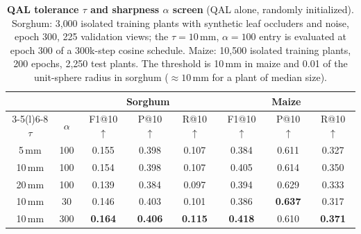 \documentclass[10pt,twocolumn,letterpaper]{article}
\begin{document}
\begin{table}[t]
  \caption{\textbf{QAL tolerance $\tau$ and sharpness $\alpha$ screen} (QAL alone, randomly initialized). Sorghum:
  3{,}000 isolated training plants with synthetic leaf occluders and noise, epoch 300, 225 validation views; the
  $\tau=10$\,mm, $\alpha=100$ entry is evaluated at epoch 300 of a 300k-step cosine schedule. Maize: 10{,}500 isolated
  training plants, 200 epochs, 2{,}250 test plants. The threshold is 10\,mm in maize and 0.01 of the unit-sphere radius
  in sorghum ($\approx 10$\,mm for a plant of median size).}
  \label{tab:qal_params}
  \centering\footnotesize
  \setlength{\tabcolsep}{2.5pt}
  \begin{tabular}{@{}cccccccc@{}}
    \toprule
    & & \multicolumn{3}{c}{Sorghum} & \multicolumn{3}{c}{Maize} \\
    \cmidrule(lr){3-5}\cmidrule(l){6-8}
    $\tau$ & $\alpha$ & F1@10 $\uparrow$ & P@10 $\uparrow$ & R@10 $\uparrow$ & F1@10 $\uparrow$ & P@10 $\uparrow$ & R@10 $\uparrow$ \\
    \midrule
    5\,mm  & 100 & 0.155 & 0.398 & 0.107 & 0.384 & 0.611 & 0.327 \\
    10\,mm & 100 & 0.154 & 0.398 & 0.107 & 0.405 & 0.614 & 0.350 \\
    20\,mm & 100 & 0.139 & 0.384 & 0.097 & 0.394 & 0.629 & 0.333 \\
    10\,mm & 30  & 0.146 & 0.403 & 0.101 & 0.386 & \textbf{0.637} & 0.317 \\
    10\,mm & 300 & \textbf{0.164} & \textbf{0.406} & \textbf{0.115} & \textbf{0.418} & 0.610 & \textbf{0.371} \\
    \bottomrule
  \end{tabular}
\end{table}
\end{document}
